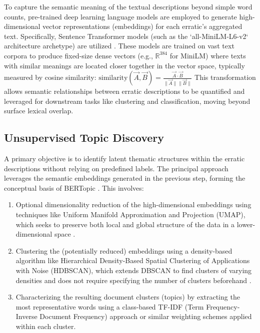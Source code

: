 To capture the semantic meaning of the textual descriptions beyond simple word counts, pre-trained deep learning language models are employed to generate high-dimensional vector representations (embeddings) for each erratic's aggregated text. Specifically, Sentence Transformer models (such as the `all-MiniLM-L6-v2` architecture archetype) are utilized \cite{Reimers2019}. These models are trained on vast text corpora to produce fixed-size dense vectors (e.g., $\mathbb{R}^{384}$ for MiniLM) where texts with similar meanings are located closer together in the vector space, typically measured by cosine similarity:
$\text{similarity}(\vec{A}, \vec{B}) = \frac{\vec{A} \cdot \vec{B}}{\|\vec{A}\| \|\vec{B}\|}$
This transformation allows semantic relationships between erratic descriptions to be quantified and leveraged for downstream tasks like clustering and classification, moving beyond surface lexical overlap.

\subsection{Unsupervised Topic Discovery}
\label{subsec:topic_discovery}

A primary objective is to identify latent thematic structures within the erratic descriptions without relying on predefined labels. The principal approach leverages the semantic embeddings generated in the previous step, forming the conceptual basis of BERTopic \cite{Grootendorst2022}. This involves:
\begin{enumerate}
    \item Optional dimensionality reduction of the high-dimensional embeddings using techniques like Uniform Manifold Approximation and Projection (UMAP), which seeks to preserve both local and global structure of the data in a lower-dimensional space \cite{McInnes2018UMAP}.
    \item Clustering the (potentially reduced) embeddings using a density-based algorithm like Hierarchical Density-Based Spatial Clustering of Applications with Noise (HDBSCAN), which extends DBSCAN to find clusters of varying densities and does not require specifying the number of clusters beforehand \cite{Campello2013HDBSCAN}.
    \item Characterizing the resulting document clusters (topics) by extracting the most representative words using a class-based TF-IDF (Term Frequency-Inverse Document Frequency) approach or similar weighting schemes applied within each cluster.
\end{enumerate}

